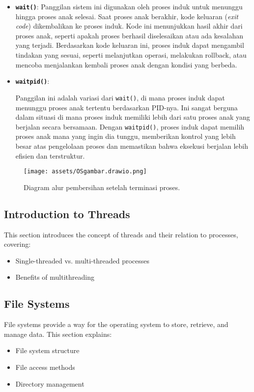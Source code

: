 \documentclass[12pt]{article}
\begin{document}
\begin{itemize}
    \item \textbf{\texttt{wait()}}: Panggilan sistem ini digunakan oleh proses induk untuk menunggu hingga proses anak selesai. Saat proses anak berakhir, kode keluaran (\textit{exit code}) dikembalikan ke proses induk. Kode ini menunjukkan hasil akhir dari proses anak, seperti apakah proses berhasil diselesaikan atau ada kesalahan yang terjadi. Berdasarkan kode keluaran ini, proses induk dapat mengambil tindakan yang sesuai, seperti melanjutkan operasi, melakukan rollback, atau mencoba menjalankan kembali proses anak dengan kondisi yang berbeda.

    
    \item \textbf{\texttt{waitpid()}}: 
    
    Panggilan ini adalah variasi dari \texttt{wait()}, di mana proses induk dapat menunggu proses anak tertentu berdasarkan PID-nya. Ini sangat berguna dalam situasi di mana proses induk memiliki lebih dari satu proses anak yang berjalan secara bersamaan. Dengan \texttt{waitpid()}, proses induk dapat memilih proses anak mana yang ingin dia tunggu, memberikan kontrol yang lebih besar atas pengelolaan proses dan memastikan bahwa eksekusi berjalan lebih efisien dan terstruktur.

 
\end{itemize}
\begin{figure}[]
    \centering
    \texttt{[image: assets/OSgambar.drawio.png]}
    \caption{Diagram alur pembersihan setelah terminasi proses.}
    \label{fig:contoh_gambar}
\end{figure}


\subsection{Introduction to Threads}
This section introduces the concept of threads and their relation to processes, covering:
\begin{itemize}
    \item Single-threaded vs. multi-threaded processes
    \item Benefits of multithreading
\end{itemize}

\subsection{File Systems}
File systems provide a way for the operating system to store, retrieve, and manage data. This section explains:
\begin{itemize}
    \item File system structure
    \item File access methods
    \item Directory management
\end{itemize}
\end{document}
